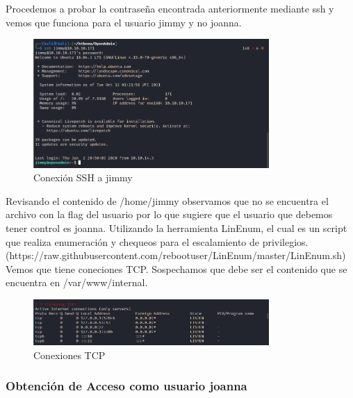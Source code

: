 \documentclass{article}
\begin{document}
Procedemos a probar la contraseña encontrada anteriormente mediante ssh y vemos que funciona para el usuario jimmy y no joanna.
\begin{figure}[h]
	\center
	\includegraphics[width=0.8\textwidth]{images/openadmin/10-sshjimmy.png}
	\caption{Conexión SSH a jimmy}
\end{figure}

Revisando el contenido de /home/jimmy observamos que no se encuentra el archivo con la flag del usuario por lo que sugiere que el usuario que debemos tener control es joanna.
Utilizando la herramienta LinEnum, el cual es un script que realiza enumeración y chequeos para el escalamiento de privilegios. (https://raw.githubusercontent.com/rebootuser/LinEnum/master/LinEnum.sh) Vemos que tiene coneciones TCP. Sospechamos que debe ser el contenido que se encuentra en /var/www/internal.
\begin{figure}[h]
	\center
	\includegraphics[width=0.8\textwidth]{images/openadmin/11-tcp.png}
	\caption{Conexiones TCP}
\end{figure}

\subsubsection{Obtención de Acceso como usuario joanna}
\end{document}
